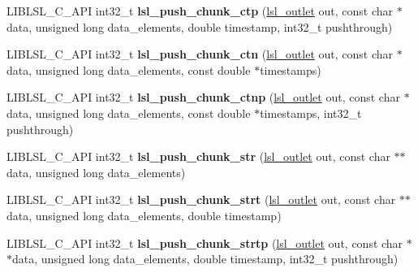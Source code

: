 \begin{DoxyCompactItemize}
\mbox{\label{namespacelsl_ad8287dab0124b1f1d8a682e914116550}} 
L\+I\+B\+L\+S\+L\+\_\+\+C\+\_\+\+A\+PI int32\+\_\+t {\bfseries lsl\+\_\+push\+\_\+chunk\+\_\+ctp} (\hyperlink{namespacelsl_abcf512b0f66dacf86c10b165995fd50b}{lsl\+\_\+outlet} out, const char $\ast$data, unsigned long data\+\_\+elements, double timestamp, int32\+\_\+t pushthrough)
\item 
\mbox{\label{namespacelsl_a2a72461381a3cfa39a33dc07312a72a6}} 
L\+I\+B\+L\+S\+L\+\_\+\+C\+\_\+\+A\+PI int32\+\_\+t {\bfseries lsl\+\_\+push\+\_\+chunk\+\_\+ctn} (\hyperlink{namespacelsl_abcf512b0f66dacf86c10b165995fd50b}{lsl\+\_\+outlet} out, const char $\ast$data, unsigned long data\+\_\+elements, const double $\ast$timestamps)
\item 
\mbox{\label{namespacelsl_a1ce559595e2b4ac431bda67fc49ec102}} 
L\+I\+B\+L\+S\+L\+\_\+\+C\+\_\+\+A\+PI int32\+\_\+t {\bfseries lsl\+\_\+push\+\_\+chunk\+\_\+ctnp} (\hyperlink{namespacelsl_abcf512b0f66dacf86c10b165995fd50b}{lsl\+\_\+outlet} out, const char $\ast$data, unsigned long data\+\_\+elements, const double $\ast$timestamps, int32\+\_\+t pushthrough)
\item 
\mbox{\label{namespacelsl_af3a72a206c0eac2ac180b31e5fbaf28f}} 
L\+I\+B\+L\+S\+L\+\_\+\+C\+\_\+\+A\+PI int32\+\_\+t {\bfseries lsl\+\_\+push\+\_\+chunk\+\_\+str} (\hyperlink{namespacelsl_abcf512b0f66dacf86c10b165995fd50b}{lsl\+\_\+outlet} out, const char $\ast$$\ast$data, unsigned long data\+\_\+elements)
\item 
\mbox{\label{namespacelsl_a3327c2e5a83c90e02270743916c302e3}} 
L\+I\+B\+L\+S\+L\+\_\+\+C\+\_\+\+A\+PI int32\+\_\+t {\bfseries lsl\+\_\+push\+\_\+chunk\+\_\+strt} (\hyperlink{namespacelsl_abcf512b0f66dacf86c10b165995fd50b}{lsl\+\_\+outlet} out, const char $\ast$$\ast$data, unsigned long data\+\_\+elements, double timestamp)
\item 
\mbox{\label{namespacelsl_a9317d0fe8f576fb80e58e362a39e12e1}} 
L\+I\+B\+L\+S\+L\+\_\+\+C\+\_\+\+A\+PI int32\+\_\+t {\bfseries lsl\+\_\+push\+\_\+chunk\+\_\+strtp} (\hyperlink{namespacelsl_abcf512b0f66dacf86c10b165995fd50b}{lsl\+\_\+outlet} out, const char $\ast$$\ast$data, unsigned long data\+\_\+elements, double timestamp, int32\+\_\+t pushthrough)
$$
\end{DoxyCompactItemize}
